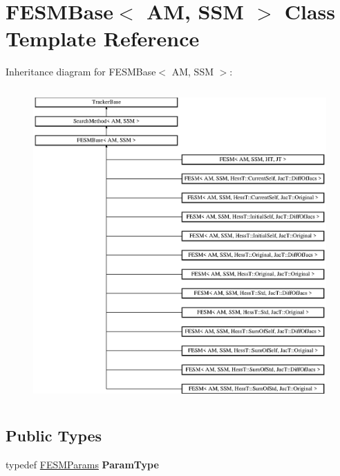 \hypertarget{classFESMBase}{\section{F\-E\-S\-M\-Base$<$ A\-M, S\-S\-M $>$ Class Template Reference}
\label{classFESMBase}
}
Inheritance diagram for F\-E\-S\-M\-Base$<$ A\-M, S\-S\-M $>$\-:\begin{figure}[H]
\begin{center}
\leavevmode
\includegraphics[height=12.000000cm]{classFESMBase}
\end{center}
\end{figure}
\subsection*{Public Types}
\begin{DoxyCompactItemize}
\item 
\hypertarget{classFESMBase_a3381cf9dd84b83d8c25206899608df05}{typedef \hyperlink{structFESMParams}{F\-E\-S\-M\-Params} {\bfseries Param\-Type}}\label{classFESMBase_a3381cf9dd84b83d8c25206899608df05}

\end{DoxyCompactItemize}
